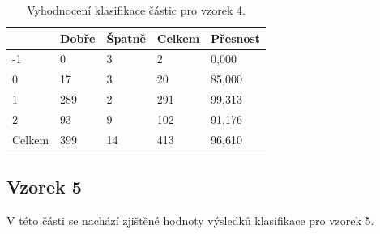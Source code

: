 \documentclass[11pt,twoside,a4paper,table]{book}
\begin{document}
\begin{table}[h]
\begin{center}
\begin{tabular}{lllll}
\rowcolor[HTML]{9B9B9B} 
\multicolumn{1}{|l|}{\cellcolor[HTML]{9B9B9B}Třída} & \multicolumn{1}{l|}{\cellcolor[HTML]{9B9B9B}Dobře} & \multicolumn{1}{l|}{\cellcolor[HTML]{9B9B9B}Špatně}  & \multicolumn{1}{l|}{\cellcolor[HTML]{9B9B9B}Celkem} & \multicolumn{1}{l|}{\cellcolor[HTML]{9B9B9B}Přesnost} \\ \hline
\multicolumn{1}{|l|}{-1}                            & \multicolumn{1}{l|}{0}                             & \multicolumn{1}{l|}{3}                               & \multicolumn{1}{l|}{2}                              & \multicolumn{1}{l|}{0,000}                            \\ \hline
\multicolumn{1}{|l|}{0}                             & \multicolumn{1}{l|}{17}                            & \multicolumn{1}{l|}{3}                               & \multicolumn{1}{l|}{20}                             & \multicolumn{1}{l|}{85,000}                           \\ \hline
\multicolumn{1}{|l|}{1}                             & \multicolumn{1}{l|}{289}                           & \multicolumn{1}{l|}{2}                               & \multicolumn{1}{l|}{291}                            & \multicolumn{1}{l|}{99,313}                           \\ \hline
\multicolumn{1}{|l|}{2}                             & \multicolumn{1}{l|}{93}                            & \multicolumn{1}{l|}{9}                               & \multicolumn{1}{l|}{102}                            & \multicolumn{1}{l|}{91,176}                           \\ \hline
\multicolumn{1}{|l|}{Celkem}                        & \multicolumn{1}{l|}{399}                           & \multicolumn{1}{l|}{14}                              & \multicolumn{1}{l|}{413}                            & \multicolumn{1}{l|}{96,610}                           \\ \hline
\end{tabular}
\end{center}
\caption{Vyhodnocení klasifikace částic pro vzorek 4.}
\label{tab:classresult5}
\end{table}

\newpage
\FloatBarrier
\subsection{Vzorek 5}
V této části se nachází zjištěné hodnoty výsledků klasifikace pro vzorek 5.
\end{document}
